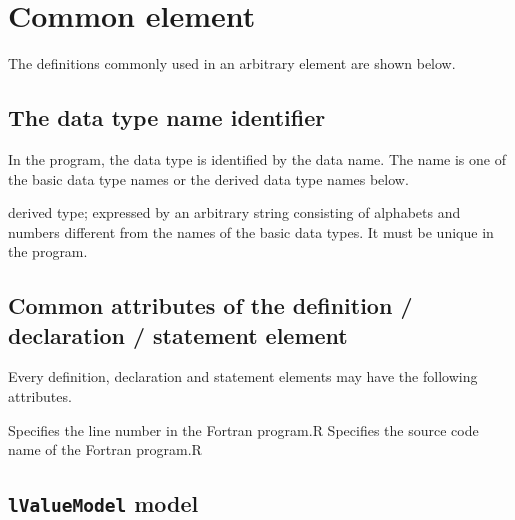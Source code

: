 \section{Common element}

The definitions commonly used in an arbitrary element are shown below.

\subsection{The data type name identifier}
\label{sec:Thedatatypenameidentifier}

In the program, the data type is identified by the data name.
The name is one of the basic data type names or the derived data type names below.
\newline

\begin{XcodeMLDataTypeNames}
{derived type; expressed by an arbitrary string consisting of alphabets and numbers
 different from the names of the basic data types. It must be unique in the program.}
\end{XcodeMLDataTypeNames}


\subsection{Common attributes of the definition / declaration / statement element}
\label{sec:Commonattributesofdefinition}

Every definition, declaration and statement elements may have the following attributes.

\begin{XcodeMLAttributes}
{Specifies the line number in the Fortran program.}{R}
{Specifies the source code name of the Fortran program.}{R}
\end{XcodeMLAttributes}


\subsection{ {\tt lValueModel} model}
\label{sec:lValueModel}

